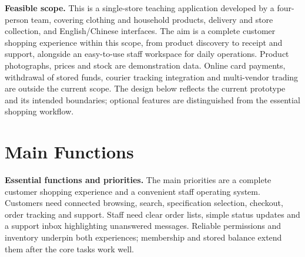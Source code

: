\documentclass[11pt,a4paper]{article}
\begin{document}
\textbf{Feasible scope.} This is a single-store teaching application developed by a four-person team, covering clothing and household products, delivery and store collection, and English/Chinese interfaces. The aim is a complete customer shopping experience within this scope, from product discovery to receipt and support, alongside an easy-to-use staff workspace for daily operations. Product photographs, prices and stock are demonstration data. Online card payments, withdrawal of stored funds, courier tracking integration and multi-vendor trading are outside the current scope. The design below reflects the current prototype and its intended boundaries; optional features are distinguished from the essential shopping workflow.

\newpage
\section{Main Functions}
\textbf{Essential functions and priorities.} The main priorities are a complete customer shopping experience and a convenient staff operating system. Customers need connected browsing, search, specification selection, checkout, order tracking and support. Staff need clear order lists, simple status updates and a support inbox highlighting unanswered messages. Reliable permissions and inventory underpin both experiences; membership and stored balance extend them after the core tasks work well.
\end{document}
